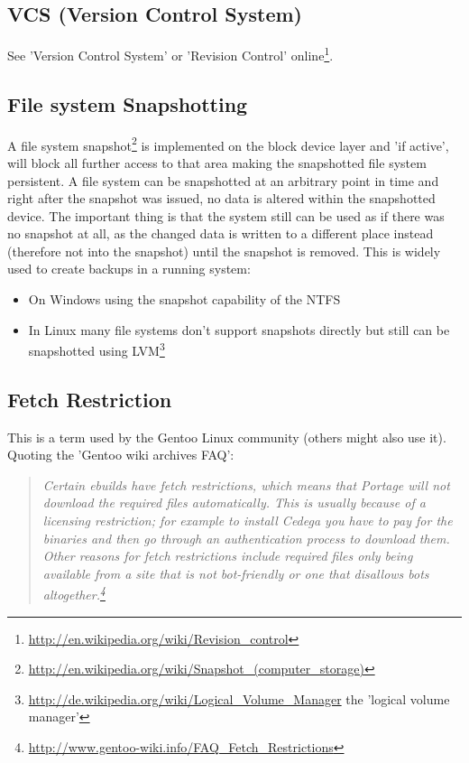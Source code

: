 \documentclass[a4paper,10pt]{article}
\begin{document}
\subsection{VCS (Version Control System)}
See 'Version Control System' or 'Revision Control' online\footnote{\url{http://en.wikipedia.org/wiki/Revision_control}}.



\subsection{File system Snapshotting}
\label{fsSnapshotting}
A file system snapshot\footnote{\url{http://en.wikipedia.org/wiki/Snapshot_(computer_storage)}} is implemented on the block device layer and 'if active', will block all further access to that area making the snapshotted file system persistent. A file system can be snapshotted at an arbitrary point in time and right after the snapshot was issued, no data is altered within the snapshotted device. The important thing is that the system still can be used as if there was no snapshot at all, as the changed data is written to a different place instead (therefore not into the snapshot) until the snapshot is removed. This is widely used to create backups in a running system:
\begin{itemize}
\item On Windows using the snapshot capability of the NTFS
\item In Linux many file systems don't support snapshots directly but still can be snapshotted using LVM\footnote{\url{http://de.wikipedia.org/wiki/Logical_Volume_Manager} the 'logical volume manager'}
\end{itemize}





\subsection{Fetch Restriction}
This is a term used by the Gentoo Linux community (others might also use it). \\

Quoting the 'Gentoo wiki archives FAQ':
\begin{quote}
\textit{Certain ebuilds have fetch restrictions, which means that Portage will not download the required files automatically. This is usually because of a licensing restriction; for example to install Cedega you have to pay for the binaries and then go through an authentication process to download them. Other reasons for fetch restrictions include required files only being available from a site that is not bot-friendly or one that disallows bots altogether.\footnote{\url{http://www.gentoo-wiki.info/FAQ_Fetch_Restrictions}}}
\end{quote}
\end{document}
